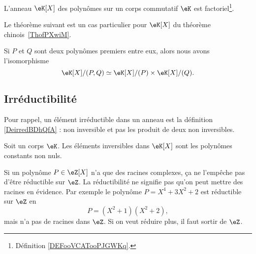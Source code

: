 \begin{proposition}     \label{PropqGZXvr}
	L'anneau \( \eK[X]\) des polynômes sur un corps commutatif \( \eK\) est factoriel\footnote{Définition \ref{DEFooVCATooPJGWKq}.}.
\end{proposition}

Le théorème suivant est un cas particulier pour \( \eK[X]\) du théorème chinois~\ref{ThofPXwiM}.
\begin{theorem}      \label{THOooICTTooQlvHNb}
	Si \( P\) et \( Q\) sont deux polynômes premiers entre eux, alors nous avons l'isomorphisme
	\begin{equation}
		\eK[X]/(P,Q)\simeq\eK[X]/(P)\times \eK[X]/(Q).
	\end{equation}
\end{theorem}


\subsection{Irréductibilité}

Pour rappel, un élément irréductible dans un anneau est la définition \ref{DeirredBDhQfA} : non inversible et pas les produit de deux non inversibles.

\begin{lemma}       \label{LEMooTMSUooCWoVHG}
	Soit un corps \( \eK\). Les éléments inversibles dans \( \eK[X]\) sont les polynômes constants non nuls.
\end{lemma}

\begin{example}
	Si un polynôme \( P\in \eZ[X]\) n'a que des racines complexes, ça ne l'empêche pas d'être réductible sur \( \eZ\). La réductibilité ne signifie pas qu'on peut mettre des racines en évidence. Par exemple le polynôme \( P=X^4+3X^2+2\) est réductible sur \( \eZ\) en
	\begin{equation}
		P=(X^2+1)(X^2+2),
	\end{equation}
	mais n'a pas de racines dans \( \eZ\). Si on veut réduire plus, il faut sortir de \( \eZ\).

\end{example}

